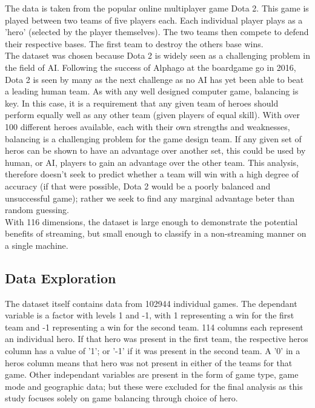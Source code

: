 \documentclass[10pt]{article}
\begin{document}
The data is taken from the popular online multiplayer game Dota 2. This game is played between two teams of five players each. Each individual player plays as a 'hero' (selected by the player themselves). The two teams then compete to defend their respective bases. The first team to destroy the others base wins.\\

The dataset was chosen because Dota 2 is widely seen as a challenging problem in the field of AI. Following the success of Alphago at the boardgame go in 2016, Dota 2 is seen by many as the next challenge as no AI has yet been able to beat a leading human team. As with any well designed computer game, balancing is key. In this case, it is a requirement that any given team of heroes should perform equally well as any other team (given players of equal skill). With over 100 different heroes available, each with their own strengths and weaknesses, balancing is a challenging problem for the game design team. If any given set of heros can be shown to have an advantage over another set, this could be used by human, or AI, players to gain an advantage over the other team. This analysis, therefore doesn't seek to predict whether a team will win with a high degree of accuracy (if that were possible, Dota 2 would be a poorly balanced and unsuccessful game); rather we seek to find any marginal advantage beter than random guessing.\\


With 116 dimensions, the dataset is large enough to demonstrate the potential benefits of streaming, but small enough to classify in a non-streaming manner on a single machine. 

\subsection{Data Exploration}

The dataset itself contains data from 102944 individual games. The dependant variable is a factor with levels 1 and -1, with 1 representing a win for the first team and -1 representing a win for the second team. 114 columns each represent an individual hero. If that hero was present in the first team, the respective heros column has a value of '1'; or '-1' if it was present in the second team. A '0' in a heros column means that hero was not present in either of the teams for that game.
Other independant variables are present in the form of game type, game mode and geographic data; but these were excluded for the final analysis as this study focuses solely on game balancing through choice of hero.\\
\end{document}
